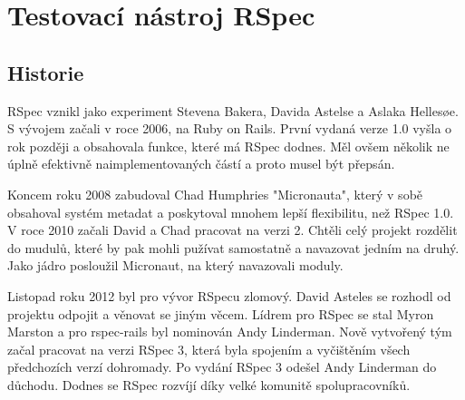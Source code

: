 \section {Testovací nástroj RSpec}
\subsection{Historie}
\par RSpec vznikl jako experiment Stevena Bakera, Davida Astelse a Aslaka Hellesøe. S vývojem začali v roce 2006, na Ruby on Rails. První vydaná verze 1.0 vyšla o rok později a obsahovala funkce, které má RSpec dodnes. Měl ovšem několik ne úplně efektivně naimplementovaných částí a proto musel být přepsán.
\par Koncem roku 2008 zabudoval Chad Humphries "Micronauta", který v sobě obsahoval systém metadat a poskytoval mnohem lepší flexibilitu, než RSpec 1.0. V roce 2010 začali David a Chad pracovat na verzi 2. Chtěli celý projekt rozdělit do mudulů, které by pak mohli pužívat samostatně a navazovat jedním na druhý. Jako jádro posloužil Micronaut, na který navazovali moduly.
\par Listopad roku 2012 byl pro vývor RSpecu zlomový. David Asteles se rozhodl od projektu odpojit a věnovat se jiným věcem. Lídrem pro RSpec se stal Myron Marston a pro rspec-rails byl nominován Andy Linderman. Nově vytvořený tým začal pracovat na verzi RSpec 3, která byla spojením a vyčištěním všech předchozích verzí dohromady. Po vydání RSpec 3 odešel Andy Linderman do důchodu. Dodnes se RSpec rozvíjí díky velké komunitě spolupracovníků.